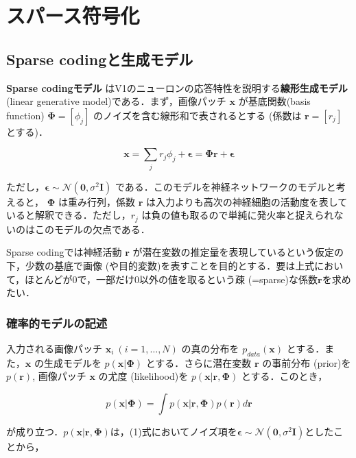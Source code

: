 \section{スパース符号化}
\subsection{Sparse codingと生成モデル}
\textbf{Sparse codingモデル} \cite{Olshausen1996-xe} \cite{Olshausen1997-qu}はV1のニューロンの応答特性を説明する\textbf{線形生成モデル} (linear generative model)である．まず，画像パッチ $\mathbf{x}$ が基底関数(basis function) $\mathbf{\Phi} = [\phi_j]$ のノイズを含む線形和で表されるとする (係数は $\mathbf{r}=[r_j]$ とする)．


\begin{equation}
\mathbf{x} = \sum_j r_j \phi_j +\boldsymbol{\epsilon}= \mathbf{\Phi} \mathbf{r}+ \boldsymbol{\epsilon}
\end{equation}


ただし，$\boldsymbol{\epsilon} \sim \mathcal{N}(\mathbf{0}, \sigma^2 \mathbf{I})$ である．このモデルを神経ネットワークのモデルと考えると， $\mathbf{\Phi}$ は重み行列，係数 $\mathbf{r}$ は入力よりも高次の神経細胞の活動度を表していると解釈できる．ただし，$r_j$ は負の値も取るので単純に発火率と捉えられないのはこのモデルの欠点である．

Sparse codingでは神経活動 $\mathbf{r}$ が潜在変数の推定量を表現しているという仮定の下，少数の基底で画像 (や目的変数)を表すことを目的とする．要は上式において，ほとんどが0で，一部だけ0以外の値を取るという疎 (=sparse)な係数$\mathbf{r}$を求めたい．
\subsubsection{確率的モデルの記述}
入力される画像パッチ $\mathbf{x}_i\ (i=1, \ldots, N)$ の真の分布を $p_{data}(\mathbf{x})$ とする．また，$\mathbf{x}$ の生成モデルを $p(\mathbf{x}|\mathbf{\Phi})$ とする．さらに潜在変数 $\mathbf{r}$ の事前分布 (prior)を $p(\mathbf{r})$, 画像パッチ $\mathbf{x}$ の尤度 (likelihood)を $p(\mathbf{x}|\mathbf{r}, \mathbf{\Phi})$ とする．このとき，


\begin{equation}
p(\mathbf{x}|\mathbf{\Phi})=\int p(\mathbf{x}|\mathbf{r}, \mathbf{\Phi})p(\mathbf{r})d\mathbf{r}
\end{equation}


が成り立つ．$p(\mathbf{x}|\mathbf{r}, \mathbf{\Phi})$は，(1)式においてノイズ項を$\boldsymbol{\epsilon} \sim\mathcal{N}(\mathbf{0}, \sigma^2 \mathbf{I})$としたことから，


